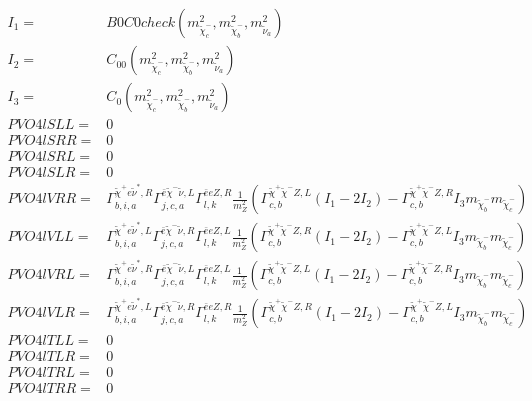 \documentclass[A4,landscape]{article}
\begin{document}
\begin{align} 
I_1= & B0C0check(m^2_{\tilde{\chi}^-_{{c}}}, m^2_{\tilde{\chi}^-_{{b}}}, m^2_{\tilde{\nu}_{{a}}}) \\ 
I_2= & C_{00}(m^2_{\tilde{\chi}^-_{{c}}}, m^2_{\tilde{\chi}^-_{{b}}}, m^2_{\tilde{\nu}_{{a}}}) \\ 
I_3= & C_0(m^2_{\tilde{\chi}^-_{{c}}}, m^2_{\tilde{\chi}^-_{{b}}}, m^2_{\tilde{\nu}_{{a}}}) \\ 
  PVO4lSLL= & 0 \\ 
  PVO4lSRR= & 0 \\ 
  PVO4lSRL= & 0 \\ 
  PVO4lSLR= & 0 \\ 
  PVO4lVRR= &  \Gamma^{\tilde{\chi}^+e \tilde{\nu}^*,R}_{b, i, a} \Gamma^{\bar{e}\tilde{\chi}^- \tilde{\nu} ,L}_{j, c, a} \Gamma^{\bar{e}e Z ,R}_{l, k} \frac{1}{m^2_{Z}} (\Gamma^{\tilde{\chi}^+\tilde{\chi}^- Z ,L}_{c, b} (I_1 - 2 I_2) - \Gamma^{\tilde{\chi}^+\tilde{\chi}^- Z ,R}_{c, b} I_3 m_{\tilde{\chi}^-_{{b}}} m_{\tilde{\chi}^-_{{c}}}) \\ 
  PVO4lVLL= &  \Gamma^{\tilde{\chi}^+e \tilde{\nu}^*,L}_{b, i, a} \Gamma^{\bar{e}\tilde{\chi}^- \tilde{\nu} ,R}_{j, c, a} \Gamma^{\bar{e}e Z ,L}_{l, k} \frac{1}{m^2_{Z}} (\Gamma^{\tilde{\chi}^+\tilde{\chi}^- Z ,R}_{c, b} (I_1 - 2 I_2) - \Gamma^{\tilde{\chi}^+\tilde{\chi}^- Z ,L}_{c, b} I_3 m_{\tilde{\chi}^-_{{b}}} m_{\tilde{\chi}^-_{{c}}}) \\ 
  PVO4lVRL= &  \Gamma^{\tilde{\chi}^+e \tilde{\nu}^*,R}_{b, i, a} \Gamma^{\bar{e}\tilde{\chi}^- \tilde{\nu} ,L}_{j, c, a} \Gamma^{\bar{e}e Z ,L}_{l, k} \frac{1}{m^2_{Z}} (\Gamma^{\tilde{\chi}^+\tilde{\chi}^- Z ,L}_{c, b} (I_1 - 2 I_2) - \Gamma^{\tilde{\chi}^+\tilde{\chi}^- Z ,R}_{c, b} I_3 m_{\tilde{\chi}^-_{{b}}} m_{\tilde{\chi}^-_{{c}}}) \\ 
  PVO4lVLR= &  \Gamma^{\tilde{\chi}^+e \tilde{\nu}^*,L}_{b, i, a} \Gamma^{\bar{e}\tilde{\chi}^- \tilde{\nu} ,R}_{j, c, a} \Gamma^{\bar{e}e Z ,R}_{l, k} \frac{1}{m^2_{Z}} (\Gamma^{\tilde{\chi}^+\tilde{\chi}^- Z ,R}_{c, b} (I_1 - 2 I_2) - \Gamma^{\tilde{\chi}^+\tilde{\chi}^- Z ,L}_{c, b} I_3 m_{\tilde{\chi}^-_{{b}}} m_{\tilde{\chi}^-_{{c}}}) \\ 
  PVO4lTLL= & 0 \\ 
  PVO4lTLR= & 0 \\ 
  PVO4lTRL= & 0 \\ 
  PVO4lTRR= & 0 \\ 
\end{align} 
\end{document}
